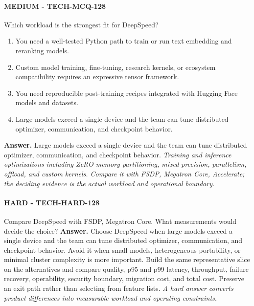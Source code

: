 \paragraph{MEDIUM - TECH-MCQ-128} Which workload is the strongest fit for DeepSpeed?
\begin{enumerate}[label=\Alph*.]
\item You need a well-tested Python path to train or run text embedding and reranking models.
\item Custom model training, fine-tuning, research kernels, or ecosystem compatibility requires an expressive tensor framework.
\item You need reproducible post-training recipes integrated with Hugging Face models and datasets.
\item Large models exceed a single device and the team can tune distributed optimizer, communication, and checkpoint behavior.
\end{enumerate}
\textbf{Answer.} Large models exceed a single device and the team can tune distributed optimizer, communication, and checkpoint behavior.
\textit{Training and inference optimizations including ZeRO memory partitioning, mixed precision, parallelism, offload, and custom kernels. Compare it with FSDP, Megatron Core, Accelerate; the deciding evidence is the actual workload and operational boundary.}
\paragraph{HARD - TECH-HARD-128} Compare DeepSpeed with FSDP, Megatron Core. What measurements would decide the choice?
\textbf{Answer.} Choose DeepSpeed when large models exceed a single device and the team can tune distributed optimizer, communication, and checkpoint behavior. Avoid it when small models, heterogeneous portability, or minimal cluster complexity is more important. Build the same representative slice on the alternatives and compare quality, p95 and p99 latency, throughput, failure recovery, operability, security boundary, migration cost, and total cost. Preserve an exit path rather than selecting from feature lists.
\textit{A hard answer converts product differences into measurable workload and operating constraints.}
